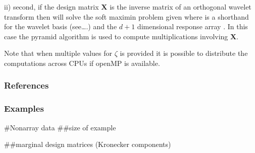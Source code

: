 \documentclass[letterpaper,10pt,english]{sphinxmanual}
\begin{document}
\begin{fulllineitems}
\sphinxAtStartPar
ii) second, if the design matrix \(\mathbf{X}\) is the inverse matrix of an
orthogonal wavelet transform  then   will solve the soft maximin 
problem given   \textendash{} where  is a shorthand for the wavelet basis (see….) \textendash{} and 
the \(d + 1\) dimensional response array  . In this case  the  pyramid algorithm is used 
to compute multiplications involving \(\mathbf{X}\).

\sphinxAtStartPar
Note that when multiple values for \(\zeta\) is provided it is  possible to
distribute the computations across CPUs if openMP is available.
\subsubsection*{References}

\sphinxAtStartPar
{}
\subsubsection*{Examples}

\sphinxAtStartPar
\#Non\sphinxhyphen{}array data \#\#size of example

\begin{sphinxVerbatim}[commandchars=\\\{\}]
   
  \PYG{p}{[}  \PYG{p}{]}
  \PYG{p}{[}  \PYG{p}{]}
\end{sphinxVerbatim}

\sphinxAtStartPar
\#\#marginal design matrices (Kronecker components)

\begin{sphinxVerbatim}[commandchars=\\\{\}]
  \PYG{p}{[}\PYG{p}{]}   
   
\PYG{p}{[}\PYG{p}{]}    \PYG{p}{[}\PYG{p}{]} \PYG{p}{[}\PYG{p}{]}
\end{sphinxVerbatim}


\end{fulllineitems}
\end{document}
